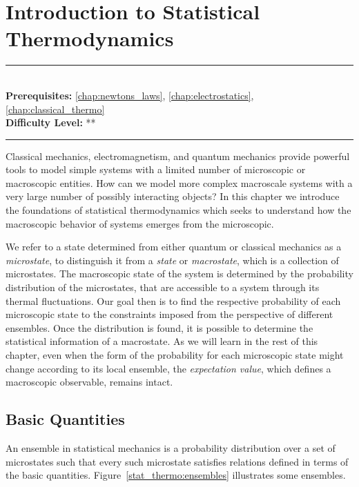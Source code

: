 \documentclass[book.tex]{subfiles}
\begin{document}
\chapter{Introduction to Statistical Thermodynamics}
\label{chap:stat_thermo}
\noindent\rule{11cm}{0.4pt} \\
\textbf{Prerequisites:}  \autoref{chap:newtons_laws}, \autoref{chap:electrostatics}, \autoref{chap:classical_thermo}  \\
\textbf{Difficulty Level:} ** \\
\noindent\rule{11cm}{0.4pt}
\vspace{5mm}

Classical mechanics, electromagnetism, and quantum mechanics provide powerful tools to model simple systems with a limited number of microscopic or macroscopic entities. How can we model more complex macroscale systems with a very large number of possibly interacting objects? In this chapter we  introduce the foundations of statistical thermodynamics  which seeks to understand how the macroscopic behavior of systems emerges from the microscopic. 

We refer to a state determined from either quantum or classical mechanics as a \textit{microstate}, to distinguish it from a \textit{state} or \textit{macrostate}, which is a collection of microstates. The macroscopic state of the system is determined by the probability distribution of the microstates, that are accessible to a system through its thermal fluctuations. Our goal then is to find the respective probability of each microscopic state  to the constraints imposed from the perspective of different ensembles. Once the distribution is found, it is possible to determine the statistical information of a macrostate. As we will learn in the rest of this chapter, even when the form of the probability for each microscopic state might change according to its local ensemble, the \textit{expectation value}, which defines a macroscopic observable, remains intact.



\section{Basic Quantities}

An ensemble in statistical mechanics is a probability distribution over a set of microstates such that every such microstate satisfies relations defined in terms of the basic quantities. Figure~\ref{stat_thermo:ensembles} illustrates some ensembles.
\end{document}
